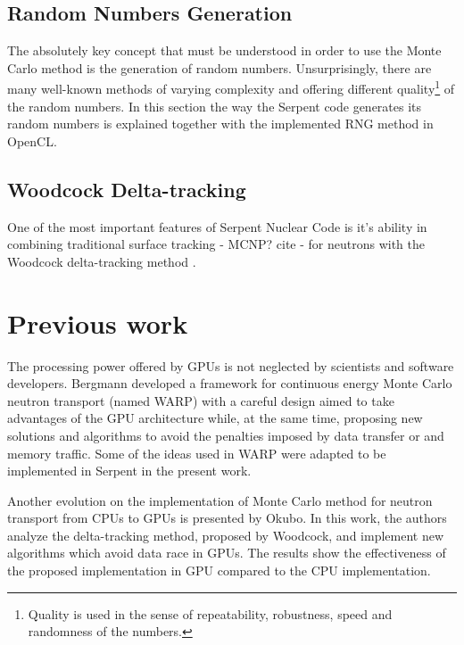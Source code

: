 \documentclass[twoside,a4paper,12pt,english]{anstrans}
\begin{document}
\subsection{Random Numbers Generation}
The absolutely key concept that must be understood in order to use the Monte Carlo method is
the generation of random numbers. Unsurprisingly, there are many well-known methods of varying
complexity and offering different quality\footnote{Quality is used in the sense of
  repeatability, robustness, speed and randomness of the numbers.} of the random numbers.
In this section the way the Serpent code generates its random numbers is explained together
with the implemented RNG method in OpenCL.

\subsection{Woodcock Delta-tracking}

One of the most important features of Serpent Nuclear Code is it's ability in combining
traditional surface tracking - MCNP? cite - for neutrons with the Woodcock delta-tracking method \cite{Woodcock1965}.

\section{Previous work}

The processing power offered by GPUs is not neglected by scientists and software developers.
Bergmann\cite{Bergmann2014} developed a framework for continuous energy Monte Carlo neutron
transport (named WARP) with a careful design aimed to take advantages of the GPU architecture while, at the
same time, proposing new solutions and algorithms to avoid the penalties imposed by data transfer
or and memory traffic. Some of the ideas used in WARP were adapted to be implemented in Serpent in
the present work.

Another evolution on the implementation of Monte Carlo method for neutron transport from CPUs to GPUs
is presented by Okubo\cite{Okubo2016}. In this work, the authors analyze the delta-tracking method,
proposed by Woodcock\cite{Woodcock1965}, and implement new algorithms which avoid data race in
GPUs. The results show the effectiveness of the proposed implementation in GPU compared to the CPU
implementation.

\end{document}
